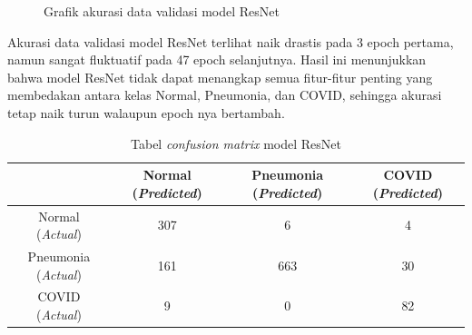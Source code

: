\documentclass{article}
\begin{document}
   		\begin{figure}[H]
   			\caption{Grafik akurasi data validasi model ResNet}
   			\label{loss_resnet}
   		\end{figure}
   		\par Akurasi data validasi model ResNet terlihat naik drastis pada 3 epoch pertama, namun sangat fluktuatif pada 47 epoch selanjutnya. Hasil ini menunjukkan bahwa model ResNet tidak dapat menangkap semua fitur-fitur penting yang membedakan antara kelas Normal, Pneumonia, dan COVID, sehingga akurasi tetap naik turun walaupun epoch nya bertambah.
   		
   		\begin{table}[H]
   			\begin{center}
   				\begin{tabular}{|c|c|c|c|}
   					\hline
   					& Normal (\textit{Predicted}) & Pneumonia (\textit{Predicted}) & COVID (\textit{Predicted}) \\
   					\hline
   					Normal (\textit{Actual}) & 307 & 6 & 4 \\
   					\hline
   					Pneumonia (\textit{Actual}) & 161 & 663 & 30 \\
   					\hline
   					COVID (\textit{Actual}) & 9 & 0 & 82 \\
   					\hline
   				\end{tabular}
   				\caption{Tabel \textit{confusion matrix} model ResNet}
   			\end{center}
   		\end{table}
   		
\end{document}
